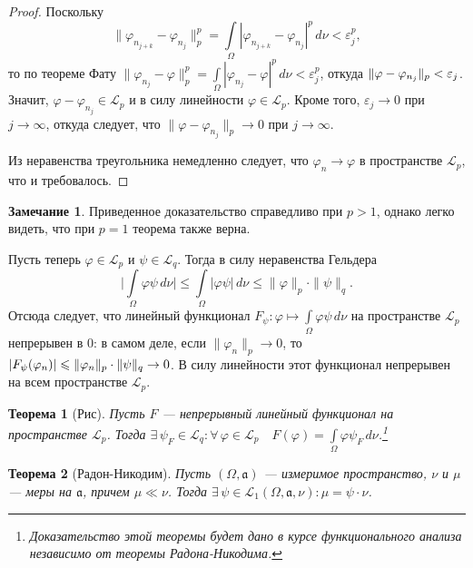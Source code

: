 \documentclass[12pt,titlepage]{article}
\newcounter{tema}
\newtheorem{theorem}{Теорема}[tema]
\theoremstyle{definition}
\newtheorem*{zam}{Замечание}
\newcommand*{\p}[1]{#1\nobreak\discretionary{}{\hbox{$\mathsurround=0pt #1$}}{}}
\begin{document}
\begin{proof}
Поскольку
$$\|\varphi_{n_{j+k}}-\varphi_{n_j}\|_p^p=\int\limits_\Omega\! |\varphi_{n_{j+k}} -
\varphi_{n_j}|^p\,d\nu<\varepsilon_j^p,$$ то по теореме Фату
$\|\varphi_{n_j}-\varphi\|_p^p=\int\limits_\Omega\!
|\varphi_{n_j}-\varphi|^p\,d\nu<\varepsilon_j^p$, откуда
$\|\varphi-\varphi_{n_j}\|_p\p<\varepsilon_j$. Значит,
$\varphi-\varphi_{n_j}\in\mathcal{L}_p$ и в силу линейности
$\varphi\in\mathcal{L}_p$. Кроме того, $\varepsilon_j\to 0$ при
$j\to\infty$, откуда следует, что $\|\varphi-\varphi_{n_j}\|_p\to 0$
при $j\to\infty$.

Из неравенства треугольника немедленно следует, что
$\varphi_n\to\varphi$ в пространстве $\mathcal{L}_p$, что и
требовалось.
\end{proof}

\begin{zam}
Приведенное доказательство справедливо при $p>1$, однако легко
видеть, что при $p=1$ теорема также верна.
\end{zam}

Пусть теперь $\varphi\in\mathcal{L}_p$ и $\psi\in\mathcal{L}_q$.
Тогда в силу неравенства Гельдера
$$\Big|\int\limits_\Omega\! \varphi\psi\,d\nu\Big|\leqslant \int\limits_
\Omega \!|\varphi\psi|\,d\nu\leqslant
\|\varphi\|_p\cdot\|\psi\|_q.$$ Отсюда следует, что линейный
функционал $F_\psi\colon \varphi\mapsto
\int\limits_\Omega\!\varphi\psi\,d\nu$ на пространстве
$\mathcal{L}_p$ непрерывен в 0: в самом деле, если
$\|\varphi_n\|_p\to 0$, то
$|F_\psi(\varphi_n)|\p\leqslant\|\varphi_n\|_p\cdot\|\psi\|_q\to 0$.
В силу линейности этот функционал непрерывен на всем пространстве
$\mathcal{L}_p$.

\begin{theorem}[Рис]
Пусть $F$ --- непрерывный линейный функционал на пространстве
$\mathcal{L}_p$. Тогда $\exists\, \psi_F\in\mathcal{L}_q:
\forall\,\varphi\in\mathcal{L}_p\quad
F(\varphi)=\int\limits_\Omega\!\varphi\psi_F\,d\nu$.\footnote{Доказательство
этой теоремы будет дано в курсе функционального анализа независимо
от теоремы Радона-Никодима.}
\end{theorem}

\begin{theorem}[Радон-Никодим]
Пусть $(\Omega,\mathfrak{a})$ --- измеримое пространство, $\nu$ и
$\mu$ --- меры на $\mathfrak{a}$, причем $\mu\ll \nu$. Тогда
$\exists\,\psi\in\mathcal{L}_1(\Omega,\mathfrak{a},\nu):
\mu=\psi\cdot\nu$.
\end{theorem}
\end{document}
